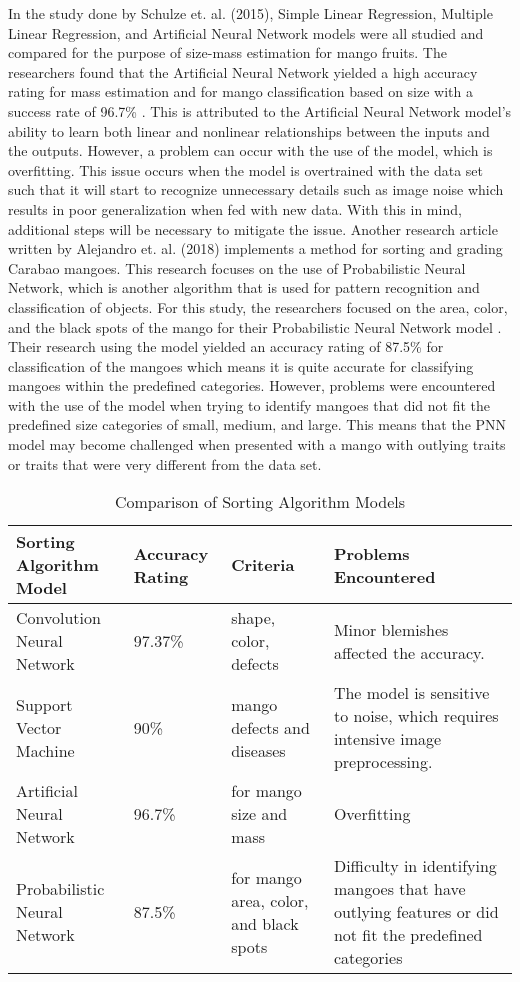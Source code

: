 In the study done by Schulze et. al. (2015), Simple
Linear Regression, Multiple Linear Regression, and Artificial Neural Network models
were all studied and compared for the purpose of size-mass estimation for mango fruits.
The researchers found that the Artificial Neural Network yielded a high accuracy rating
for mass estimation and for mango classification based on size with a success rate of
96.7\% \cite{schulze-development-2015}. This is attributed to the Artificial Neural Network model’s ability to learn both
linear and nonlinear relationships between the inputs and the outputs. However, a
problem can occur with the use of the model, which is overfitting. This issue occurs
when the model is overtrained with the data set such that it will start to recognize
unnecessary details such as image noise which results in poor generalization when fed
with new data. With this in mind, additional steps will be necessary to mitigate the issue.
Another research article written by Alejandro et. al. (2018)
implements a method for sorting and grading Carabao mangoes. This research focuses
on the use of Probabilistic Neural Network, which is another algorithm that is used for
pattern recognition and classification of objects. For this study, the researchers focused
on the area, color, and the black spots of the mango for their Probabilistic Neural
Network model \cite{alejandro-grading-2018}. Their research using the model yielded an accuracy rating of 87.5\% for
classification of the mangoes which means it is quite accurate for classifying mangoes
within the predefined categories. However, problems were encountered with the use of
the model when trying to identify mangoes that did not fit the predefined size categories
of small, medium, and large. This means that the PNN model may become challenged
when presented with a mango with outlying traits or traits that were very different from
the data set.

\begin{table}[h]
	\centering
	\caption{Comparison of Sorting Algorithm Models}
	\label{tab:sorting_algorithm_models}
	\renewcommand{\arraystretch}{1.3} %
	\begin{tabular}{p{}|p{}|p{}|p{}}
		\hline
		\textbf{Sorting Algorithm Model} & \textbf{Accuracy Rating} & \textbf{Criteria} & \textbf{Problems Encountered} \\
		\hline
		Convolution Neural Network & 97.37\% & shape, color, defects & Minor blemishes affected the accuracy. \\
		\hline
		Support Vector Machine & 90\% & mango defects and diseases & The model is sensitive to noise, which requires intensive image preprocessing. \\
		\hline
		Artificial Neural Network & 96.7\% & for mango size and mass & Overfitting \\
		\hline
		Probabilistic Neural Network & 87.5\% & for mango area, color, and black spots & Difficulty in identifying mangoes that have outlying features or did not fit the predefined 		categories \\
		\hline
	\end{tabular}
\end{table}

